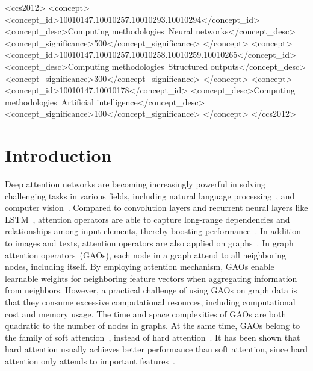 \documentclass[sigconf]{acmart}
\begin{document}
\begin{CCSXML}
<ccs2012>
<concept>
<concept_id>10010147.10010257.10010293.10010294</concept_id>
<concept_desc>Computing methodologies~Neural networks</concept_desc>
<concept_significance>500</concept_significance>
</concept>
<concept>
<concept_id>10010147.10010257.10010258.10010259.10010265</concept_id>
<concept_desc>Computing methodologies~Structured outputs</concept_desc>
<concept_significance>300</concept_significance>
</concept>
<concept>
<concept_id>10010147.10010178</concept_id>
<concept_desc>Computing methodologies~Artificial intelligence</concept_desc>
<concept_significance>100</concept_significance>
</concept>
</ccs2012>
\end{CCSXML}




\maketitle



\section{Introduction}

Deep attention networks are becoming increasingly powerful in
solving challenging tasks in various fields, including natural
language
processing~\cite{vaswani2017attention,luong2015effective,devlin2018bert},
and computer vision~\cite{wang2018non,xu2015show,zhao2018psanet}.
Compared to convolution layers and recurrent neural layers like
LSTM~\cite{hochreiter1997long,gregor2015draw}, attention operators
are able to capture long-range dependencies and relationships among
input elements, thereby boosting
performance~\cite{devlin2018bert,li2018non}. In addition to images
and texts, attention operators are also applied on
graphs~\cite{velivckovic2017graph}. In graph attention
operators~(GAOs), each node in a graph attend to all neighboring
nodes, including itself. By employing attention mechanism, GAOs
enable learnable weights for neighboring feature vectors when
aggregating information from neighbors. However, a practical
challenge of using GAOs on graph data is that they consume excessive
computational resources, including computational cost and memory
usage. The time and space complexities of GAOs are both quadratic to
the number of nodes in graphs. At the same time, GAOs belong to the
family of soft attention~\cite{jaderberg2015spatial}, instead of
hard attention~\cite{xu2015show}. It has been shown that hard
attention usually achieves better performance than soft attention,
since hard attention only attends to important
features~\cite{shankar2018surprisingly,xu2015show,yu2019st}.
\end{document}
